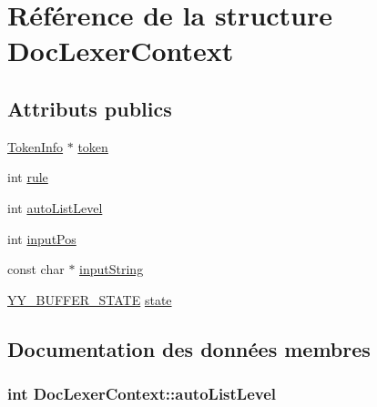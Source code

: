 \hypertarget{struct_doc_lexer_context}{}\section{Référence de la structure Doc\+Lexer\+Context}
\label{struct_doc_lexer_context}
\subsection*{Attributs publics}
\begin{DoxyCompactItemize}
\item 
\hyperlink{struct_token_info}{Token\+Info} $\ast$ \hyperlink{struct_doc_lexer_context_a0d0279acd580f1391253e0cb4de291d6}{token}
\item 
int \hyperlink{struct_doc_lexer_context_af2e9a68a5dac05327ccc406c1a8e2669}{rule}
\item 
int \hyperlink{struct_doc_lexer_context_af642c9d98d61a5f08c615d79a0c4fcd1}{auto\+List\+Level}
\item 
int \hyperlink{struct_doc_lexer_context_a427c0399bce8e80117f6133f1fc211e8}{input\+Pos}
\item 
const char $\ast$ \hyperlink{struct_doc_lexer_context_a2635bb7ec48f95756b72f5ce53d19500}{input\+String}
\item 
\hyperlink{code_8cpp_a4e5bd2d129903df83f3d13effaf8f3e4}{Y\+Y\+\_\+\+B\+U\+F\+F\+E\+R\+\_\+\+S\+T\+A\+T\+E} \hyperlink{struct_doc_lexer_context_aff59ac36da3634c543277ef8b5575aca}{state}
\end{DoxyCompactItemize}


\subsection{Documentation des données membres}
\hypertarget{struct_doc_lexer_context_af642c9d98d61a5f08c615d79a0c4fcd1}{}
\subsubsection[{auto\+List\+Level}]{\setlength{\rightskip}{0pt plus 5cm}int Doc\+Lexer\+Context\+::auto\+List\+Level}\label{struct_doc_lexer_context_af642c9d98d61a5f08c615d79a0c4fcd1}
\hypertarget{struct_doc_lexer_context_a427c0399bce8e80117f6133f1fc211e8}{}
